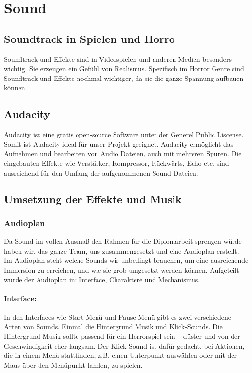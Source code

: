 \section{Sound}
\subsection{Soundtrack in Spielen und Horro}
Soundtrack und Effekte sind in Videospielen und anderen Medien besonders wichtig.
Sie erzeugen ein Gefühl von Realismus. Spezifisch im Horror Genre sind Soundtrack und Effekte nochmal wichtiger, da sie die ganze Spannung aufbauen können.

\subsection{Audacity}
Audacity ist eine gratis open-source Software unter der Generel Public Liscense.
Somit ist Audacity ideal für unser Projekt geeignet. Audacity ermöglicht das Aufnehmen und bearbeiten von Audio Dateien, auch mit mehreren Spuren.
Die eingebauten Effekte wie Verstärker, Kompressor, Rückwärts, Echo etc. sind ausreichend für den Umfang der aufgenommenen Sound Dateien.

\subsection{Umsetzung der Effekte und Musik}
\subsubsection{Audioplan}
Da Sound im vollen Ausmaß den Rahmen für die Diplomarbeit sprengen würde haben wir, das ganze Team, uns zusammengesetzt und eine
Audioplan erstellt. Im Audioplan steht welche Sounds wir unbedingt brauchen,
um eine ausreichende Immersion zu erreichen, und wie sie grob umgesetzt werden können. Aufgeteilt wurde der Audioplan in: Interface, Charaktere und Mechanismus.

\paragraph{Interface:}
In den Interfaces wie Start Menü und Pause Menü gibt es zwei verschiedene Arten von Sounds. Einmal die Hintergrund Musik und Klick-Sounds.
Die Hintergrund Musik sollte passend für ein Horrorspiel sein – düster und von der Geschwindigkeit eher langsam.
Der Klick-Sound ist dafür gedacht, bei Aktionen, die in einem Menü stattfinden, z.B. einen Unterpunkt auswählen oder mit der Maus über den Menüpunkt landen, zu spielen.

